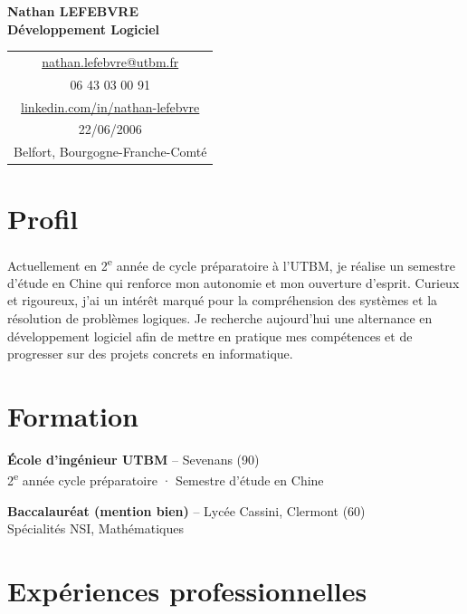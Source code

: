 \documentclass[a4paper,10pt]{article}
\begin{document}
\begin{center}
    {\Huge \textbf{Nathan LEFEBVRE}} \\[5pt]
    \textbf{Développement Logiciel} \\[10pt]
    \begin{tabular}{c}
        \href{mailto:nathan.lefebvre@utbm.fr}{nathan.lefebvre@utbm.fr} \\
        06 43 03 00 91 \\
        \href{https://linkedin.com/in/nathan-lefebvre-2b1a11327}{linkedin.com/in/nathan-lefebvre} \\
        22/06/2006 \\[5pt]
        Belfort, Bourgogne-Franche-Comté
    \end{tabular}
\end{center}

\section{Profil}
Actuellement en 2\textsuperscript{e} année de cycle préparatoire à l'UTBM, je réalise un semestre d'étude en Chine qui renforce mon autonomie et mon ouverture d'esprit. Curieux et rigoureux, j'ai un intérêt marqué pour la compréhension des systèmes et la résolution de problèmes logiques. Je recherche aujourd'hui une alternance en développement logiciel afin de mettre en pratique mes compétences et de progresser sur des projets concrets en informatique.

\section{Formation}
\textbf{École d'ingénieur UTBM} – Sevenans (90) \\
2\textsuperscript{e} année cycle préparatoire · Semestre d'étude en Chine

\textbf{Baccalauréat (mention bien)} – Lycée Cassini, Clermont (60) \\
Spécialités NSI, Mathématiques

\section{Expériences professionnelles}
\end{document}
